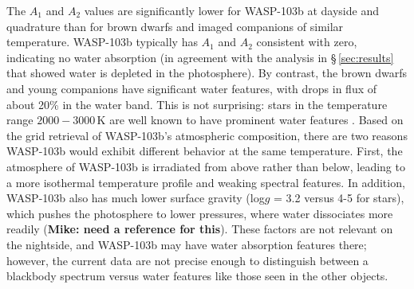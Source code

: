 \documentclass[twocolumn]{aastex61}
\begin{document}
The $A_1$ and $A_2$ values are significantly lower for WASP-103b at dayside and quadrature than for brown dwarfs and imaged companions of similar temperature. WASP-103b typically has $A_1$ and $A_2$ consistent with zero, indicating no water absorption (in agreement with the analysis in \S\,\ref{sec:results} that showed water is depleted in the photosphere). By contrast, the brown dwarfs and young companions have significant water features, with drops in flux of about 20\% in the water band. This is not surprising: stars in the temperature range $2000 - 3000\,\mathrm{K}$ are well known to have prominent water features \citep{kirkpatrick93}.  Based on the grid retrieval of WASP-103b's atmospheric composition, there are two reasons WASP-103b would exhibit different behavior at the same temperature. First, the atmosphere of WASP-103b is irradiated from above rather than below, leading to a more isothermal temperature profile and weaking spectral features. In addition, WASP-103b also has much lower surface gravity (log$g$ = 3.2 versus 4-5 for stars), which pushes the photosphere to lower pressures, where water dissociates more readily (\textbf{Mike: need a reference for this}). These factors are not relevant on the nightside, and WASP-103b may have water absorption features there; however, the current data are not precise enough to distinguish between a blackbody spectrum versus water features like those seen in the other objects. 
\end{document}
